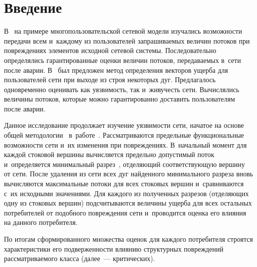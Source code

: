 
  
\vspace*{-4pt}



\thispagestyle{headings}

\begin{multicols}{2}

\label{st\stat}


\section{Введение}

В~\cite{MalInf17}  на примере    многопользовательской  сетевой
модели  изучались возможности   передачи всем и~каждому из  пользователей   
запрашиваемых  вели\-чин  потоков при повреждениях  элементов исходной сетевой системы.  
Последовательно определялись   гарантированные оценки   величин  потоков, 
передаваемых в~сети после  аварии.   В~\cite{MalInf181} был предложен метод   
определения  векторов  ущерба  для   пользователей сети   при  выходе из строя 
некоторых  дуг.    Предлагалось  одновременно оценивать как  уязвимость,  
так и~живучесть  сети.  Вычислялись    величины потоков,   которые    
можно гарантированно  доставить пользователям после аварии.

Данное исследование продолжает изучение уязвимости сети, начатое на основе 
общей методологии~\cite{Germ} в~работе~\cite{MalInf183}. Рассматриваются 
предельные функциональные  возможности сети и~их изменения при повреждениях. 
В~начальный момент  для каждой стоковой вершины   вычисляется  предельно 
допустимый поток  и~определяется минимальный разрез~\cite{Yen},  отделяющий  
соответствующую  вершину  от сети. После   удаления из сети всех дуг  найден\-но\-го   
минимального   разреза  вновь   вычисляются   максимальные     потоки для всех    
стоковых вершин и~сравниваются с~их исходными  значениями. Для каждого из 
полученных разрезов (отделяющих одну из стоковых вершин) подсчитываются величины 
ущерба для всех остальных потребителей от подобного повреждения сети и~проводится 
оценка его влияния на данного потребителя.  

По итогам сформированного множества 
оценок для каждого потребителя строятся характеристики его подверженности 
влиянию структурных повреждений рассматриваемого класса  (далее~--- критических).


\end{multicols}
